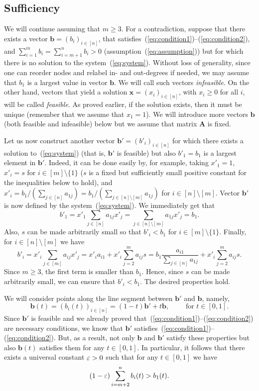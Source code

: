 \subsection{Sufficiency}

We will continue assuming that $m \geq 3$. For a contradiction, suppose that there exists a vector $\mathbf{b} = (b_i)_{i \in [n]}$, that satisfies~(\ref{eq:condition1})--(\ref{eq:condition2}), and $\sum_{i=1}^{m}b_i=\sum_{i=m+1}^{n}b_i>0$ (assumption~(\ref{eq:assumption})) but for which there is no solution to the system~(\ref{eq:system}). Without loss of generality, since one can reorder nodes and relabel in- and out-degrees if needed, we may assume that $b_1$ is a largest value in vector $\mathbf{b}$. We will call such vectors \emph{infeasible}. On the other hand, vectors that yield a solution $\mathbf{x} = (x_i)_{i \in [n]}$, with $x_i\geq0$ for all $i$, will be called \emph{feasible}. As proved earlier, if the solution exists, then it must be unique (remember that we assume that $x_1=1$). We will introduce more vectors $\textbf{b}$ (both feasible and infeasible) below but we assume that matrix $\textbf{A}$ is fixed.

Let us now construct another vector $\mathbf{b}' = (b'_i)_{i \in [n]}$ for which there exists a solution to~(\ref{eq:system}) (that is, $\mathbf{b}'$ is feasible) but also $b'_1=b_1$ is a largest element in $\mathbf{b}'$. Indeed, it can be done easily by, for example, taking $x'_1=1$, $x'_i = s$ for $i\in[m]\setminus\{1\}$ ($s$ is a fixed but sufficiently small positive constant for the inequalities below to hold), and $x'_i = b_1 / (\sum_{j \in [n]} a_{1j}) = b_1 / (\sum_{j \in [n] \setminus [m]} a_{1j})$ for $i\in[n]\setminus[m]$. Vector $\mathbf{b}'$ is now defined by the system~(\ref{eq:system}). We immediately get that
$$
b'_1 = x'_1 \sum_{j \in [n]} a_{1j} x'_j = \sum_{j \in [n] \setminus [m]} a_{1j} x'_j = b_1.
$$
Also, $s$ can be made arbitrarily small so that $b'_i<b_1$ for $i\in[m]\setminus\{1\}$.
Finally, for $i \in[n]\setminus[m]$ we have
$$
b'_i = x'_i \sum_{j \in [m]} a_{ij} x'_j = x'_i a_{i1} + x'_i \sum_{j=2}^m a_{ij} s = b_1 \frac{a_{i1}} {\sum_{j \in [n]} a_{1j}} + x'_i \sum_{j=2}^m a_{ij} s.
$$
Since $m \ge 3$, the first term is smaller than $b_1$. Hence, since $s$ can be made arbitrarily small, we can ensure that $b'_i < b_1$. The desired properties hold.

We will consider points along the line segment between $\mathbf{b}'$ and $\mathbf{b}$, namely,
$$
\mathbf{b}(t) = (b_i(t))_{i \in [n]} = (1-t)\mathbf{b}'+t\mathbf{b}, \qquad \text{ for } t\in[0,1].
$$
Since $\mathbf{b}'$ is feasible and we already proved that~(\ref{eq:condition1})--(\ref{eq:condition2}) are necessary conditions, we know that $\mathbf{b}'$ satisfies~(\ref{eq:condition1})--(\ref{eq:condition2}). But, as a result, not only $\mathbf{b}$ and $\mathbf{b}'$ satisfy these properties but also $\mathbf{b}(t)$ satisfies them for any $t \in [0,1]$. In particular, it follows that there exists a universal constant $\varepsilon > 0$ such that for any $t \in [0,1]$ we have 
\begin{equation}\label{eq:separation}
(1-\varepsilon)\sum_{i=m+2}^nb_i(t) > b_1(t).
\end{equation}

